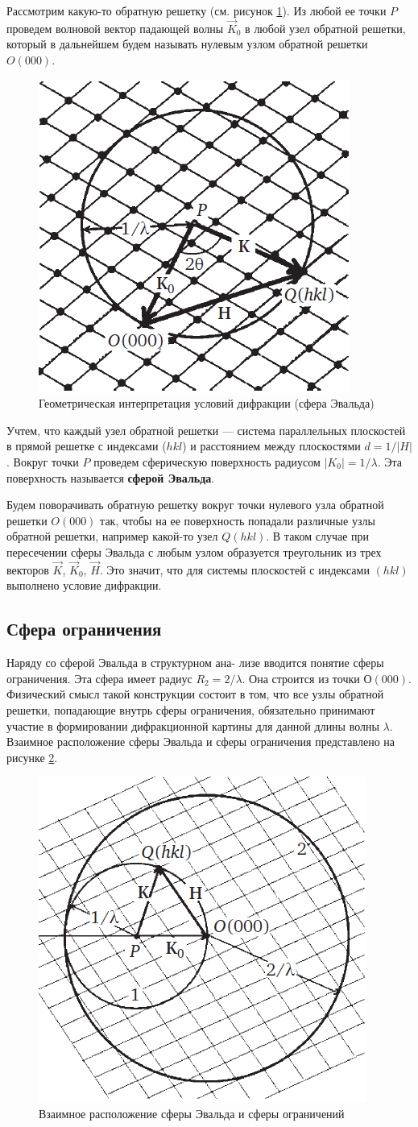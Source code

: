 \documentclass[a4paper, 12pt]{article}
\begin{document}
Рассмотрим какую-то обратную решетку (см. рисунок \ref{fig:evald}). Из любой ее точки $P$ проведем волновой вектор падающей волны $\vec{K}_0$ в любой узел обратной решетки, который в дальнейшем будем называть нулевым узлом обратной решетки $O(000)$.

\begin{figure}[H]
	\centering
	\includegraphics[width=0.5\linewidth]{Evald}
	\caption{Геометрическая интерпретация условий дифракции (сфера Эвальда)}
	\label{fig:evald}
\end{figure}

Учтем, что каждый узел обратной решетки --- система параллельных плоскостей в прямой решетке с индексами ($hkl$) и расстоянием между плоскостями $d = 1 / |H|$. Вокруг точки $P$ проведем сферическую поверхность радиусом $|K_0| = 1/\lambda$. Эта поверхность называется \textbf{сферой Эвальда}.

Будем поворачивать обратную решетку вокруг точки нулевого узла обратной решетки $O(000)$ так, чтобы на ее поверхность попадали различные узлы обратной решетки, например какой-то узел $Q(hkl)$. В таком случае при пересечении сферы Эвальда с любым узлом образуется треугольник из трех векторов $\vec{K}$, $\vec{K}_0$, $\vec{H}$. Это значит, что для системы плоскостей с индексами $(hkl)$ выполнено условие дифракции.

\subsection{Сфера ограничения}

Наряду со сферой Эвальда в структурном ана- лизе вводится понятие сферы ограничения. Эта сфера имеет радиус $R_2 = 2/\lambda$. Она строится из точки $О(000)$. Физический смысл такой конструкции состоит в том, что все узлы обратной решетки, попадающие внутрь сферы ограничения, обязательно принимают участие в формировании дифракционной картины для данной длины волны $\lambda$. Взаимное расположение сферы Эвальда и сферы ограничения представлено на рисунке \ref{fig:evald_limit}.

\begin{figure}[H]
	\centering
	\includegraphics[width=0.5\linewidth]{Evald_limit}
	\caption{Взаимное расположение сферы Эвальда и сферы ограничений}
	\label{fig:evald_limit}
\end{figure}
 
\end{document}
